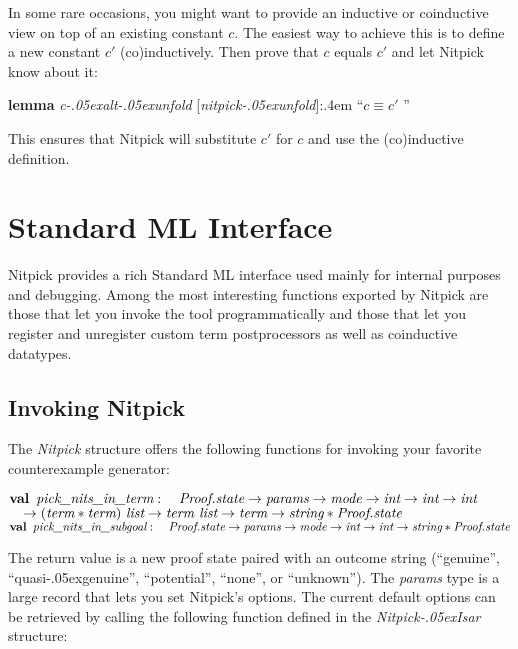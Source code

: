 \documentclass[a4paper,12pt]{article}
\renewcommand\_{\hbox{\textunderscore\kern-.05ex}}
\begin{document}
In some rare occasions, you might want to provide an inductive or coinductive
view on top of an existing constant $c$. The easiest way to achieve this is to
define a new constant $c'$ (co)inductively. Then prove that $c$ equals $c'$
and let Nitpick know about it:

\prew
\textbf{lemma} \textit{c\_alt\_unfold} [\textit{nitpick\_unfold}]:\kern.4em ``$c \equiv c'$\kern2pt ''
\postw

This ensures that Nitpick will substitute $c'$ for $c$ and use the (co)inductive
definition.

\section{Standard ML Interface}
\label{standard-ml-interface}

Nitpick provides a rich Standard ML interface used mainly for internal purposes
and debugging. Among the most interesting functions exported by Nitpick are
those that let you invoke the tool programmatically and those that let you
register and unregister custom term postprocessors as well as coinductive
datatypes.

\subsection{Invoking Nitpick}
\label{invoking-nitpick}

The \textit{Nitpick} structure offers the following functions for invoking your
favorite counterexample generator:

\prew
$\textbf{val}\,~\textit{pick\_nits\_in\_term} : \\
\hbox{}\quad\textit{Proof.state} \rightarrow \textit{params} \rightarrow \textit{mode}
\rightarrow \textit{int} \rightarrow \textit{int} \rightarrow \textit{int}$ \\
$\hbox{}\quad{\rightarrow}\; (\textit{term} * \textit{term})~\textit{list}
\rightarrow \textit{term~list} \rightarrow \textit{term} \rightarrow \textit{string} * \textit{Proof.state}$ \\
$\textbf{val}\,~\textit{pick\_nits\_in\_subgoal} : \\
\hbox{}\quad\textit{Proof.state} \rightarrow \textit{params} \rightarrow \textit{mode} \rightarrow \textit{int} \rightarrow \textit{int} \rightarrow \textit{string} * \textit{Proof.state}$
\postw

The return value is a new proof state paired with an outcome string
(``genuine'', ``quasi\_genuine'', ``potential'', ``none'', or ``unknown''). The
\textit{params} type is a large record that lets you set Nitpick's options. The
current default options can be retrieved by calling the following function
defined in the \textit{Nitpick\_Isar} structure:
\end{document}
